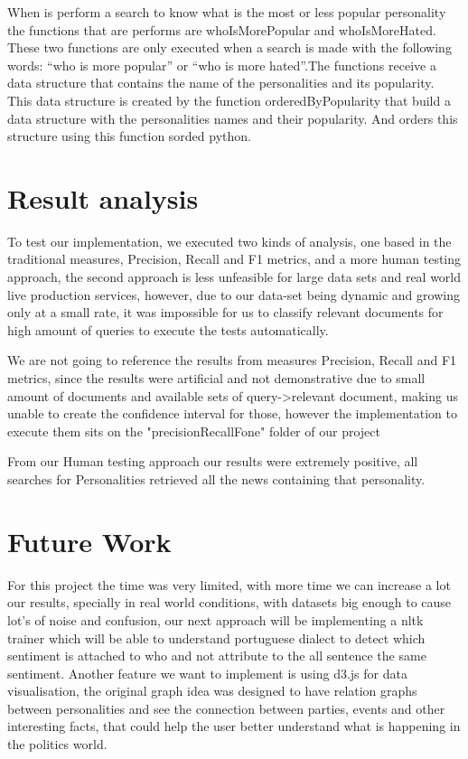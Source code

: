 \documentclass{acm_proc_article-sp}
\begin{document}
When is perform a search to know what is the most or less popular personality the functions that are performs are whoIsMorePopular and whoIsMoreHated. These two functions are only executed when a search is made with the following words: “who is more popular” or “who is more hated”.The functions receive a data structure that contains the name of the personalities and its popularity. This data structure is created by the function orderedByPopularity that build a data structure with the personalities names and their popularity. And orders this structure using this function sorded python.


\section{Result analysis}
To test our implementation, we executed two kinds of analysis, one based in the traditional measures, Precision, Recall and F1 metrics, and a more human testing approach, the second approach is less unfeasible for large data sets and real world live production services, however, due to our data-set being dynamic and growing only at a small rate, it was impossible for us to classify relevant documents for high amount of queries to execute the tests automatically.

We are not going to reference the results from measures Precision, Recall and F1 metrics, since the results were artificial and not demonstrative due to small amount of documents and available sets of query->relevant document, making us unable to create the confidence interval for those, however the implementation to execute them sits on the "precisionRecallFone" folder of our project

From our Human testing approach our results were extremely positive, all searches for Personalities retrieved all the news containing that personality.

\section{Future Work}
For this project the time was very limited, with more time we can increase a lot our results, specially in real world conditions, with datasets big enough to cause lot's of noise and confusion, our next approach will be implementing a nltk trainer which will be able to understand portuguese dialect to detect which sentiment is attached to who and not attribute to the all sentence the same sentiment.
Another feature we want to implement is using d3.js for data visualisation, the original graph idea was designed to have relation graphs between personalities and see the connection between parties, events and other interesting facts, that could help the user better understand what is happening in the politics world.
\end{document}
